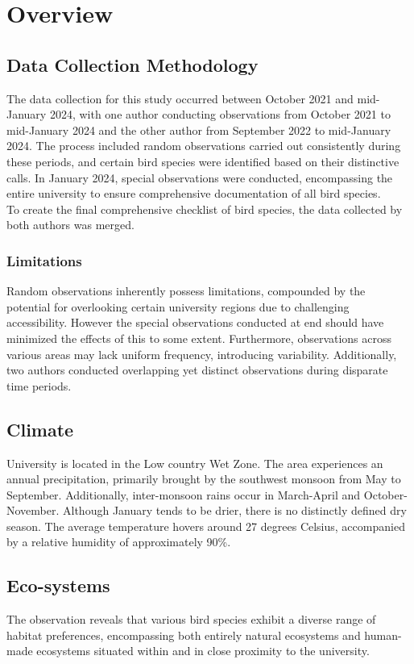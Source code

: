\chapter{Overview}
\label{cp:overview}
\section{Data Collection Methodology}
The data collection for this study occurred between October 2021 and mid-January 2024, with one author conducting observations from October 2021 to mid-January 2024 and the other author from September 2022 to mid-January 2024. The process included random observations carried out consistently during these periods, and certain bird species were identified based on their distinctive calls. In January 2024, special observations were conducted, encompassing the entire university to ensure comprehensive documentation of all bird species.
\\
To create the final comprehensive checklist of bird species, the data collected by both authors was merged.

\begin{importantbox}
\subsection{Limitations}
 Random observations inherently possess limitations, compounded by the potential for overlooking certain university regions due to challenging accessibility. However the special observations conducted at end should have minimized the effects of this to some extent. Furthermore, observations across various areas may lack uniform frequency, introducing variability. Additionally, two authors conducted overlapping yet distinct observations during disparate time periods.
\end{importantbox}

\section{Climate}
University is located in the Low country Wet Zone. The area experiences an annual precipitation, primarily brought by the southwest monsoon from May to September. Additionally, inter-monsoon rains occur in March-April and October-November. Although January tends to be drier, there is no distinctly defined dry season. The average temperature hovers around 27 degrees Celsius, accompanied by a relative humidity of approximately 90\%.

\section{Eco-systems}
The observation reveals that various bird species exhibit a diverse range of habitat preferences, encompassing both entirely natural ecosystems and human-made ecosystems situated within and in close proximity to the university.

